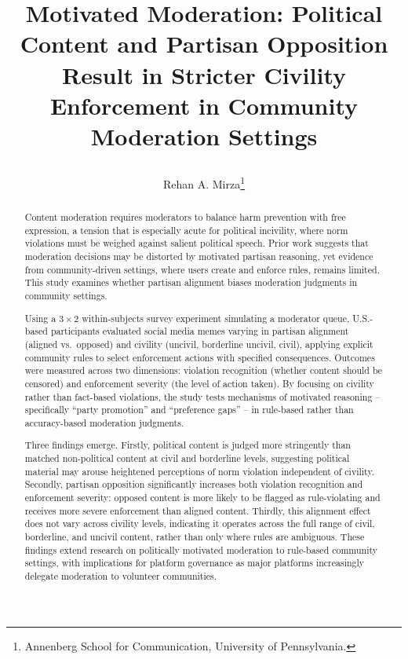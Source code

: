 \documentclass[12pt]{article}
\title{%
\begin{minipage}{0.88\textwidth}
\centering
\Large
Motivated Moderation: Political Content and Partisan Opposition Result in Stricter Civility Enforcement in Community Moderation Settings
\end{minipage}
}
\author{Rehan A. Mirza\thanks{Annenberg School for Communication, University of Pennsylvania.}}
\date{}
\begin{document}
\maketitle
\begin{abstract}

\noindent Content moderation requires moderators to balance harm prevention with free expression, a tension that is especially acute for political incivility, where norm violations must be weighed against salient political speech. Prior work suggests that moderation decisions may be distorted by motivated partisan reasoning, yet evidence from community-driven settings, where users create and enforce rules, remains limited. This study examines whether partisan alignment biases moderation judgments in community settings.

\vspace{0.75em}


\noindent Using a $3\times2$ within-subjects survey experiment simulating a moderator queue, U.S.-based participants evaluated social media memes varying in partisan alignment (aligned vs.\ opposed) and civility (uncivil, borderline uncivil, civil), applying explicit community rules to select enforcement actions with specified consequences. Outcomes were measured across two dimensions: violation recognition (whether content should be censored) and enforcement severity (the level of action taken). By focusing on civility rather than fact-based violations, the study tests mechanisms of motivated reasoning -- specifically \enquote{party promotion} and \enquote{preference gaps} -- in rule-based rather than accuracy-based moderation judgments.

\vspace{0.75em}


\noindent Three findings emerge. Firstly, political content is judged more stringently than matched non-political content at civil and borderline levels, suggesting political material may arouse heightened perceptions of norm violation independent of civility. Secondly, partisan opposition significantly increases both violation recognition and enforcement severity: opposed content is more likely to be flagged as rule-violating and receives more severe enforcement than aligned content. Thirdly, this alignment effect does not vary across civility levels, indicating it operates across the full range of civil, borderline, and uncivil content, rather than only where rules are ambiguous. These findings extend research on politically motivated moderation to rule-based community settings, with implications for platform governance as major platforms increasingly delegate moderation to volunteer communities.

\end{abstract}
\end{document}
